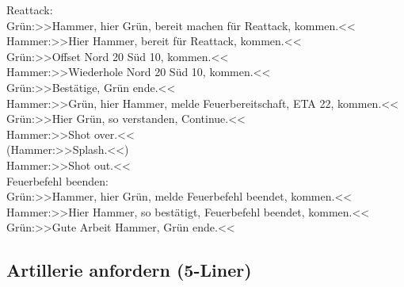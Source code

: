 	Reattack:  \\
	 Grün:>>Hammer, hier Grün, bereit machen für Reattack, kommen.<<  \\
	 Hammer:>>Hier Hammer, bereit für Reattack, kommen.<< \\
	 Grün:>>Offset Nord 20 Süd 10, kommen.<< \\
	 Hammer:>>Wiederhole Nord 20 Süd 10, kommen.<< \\
	 Grün:>>Bestätige, Grün ende.<< \\
	 Hammer:>>Grün, hier Hammer, melde Feuerbereitschaft, ETA 22, kommen.<< \\
	 Grün:>>Hier Grün, so verstanden, Continue.<< \\
	 Hammer:>>Shot over.<< \\
	 (Hammer:>>Splash.<<) \\
	 Hammer:>>Shot out.<< \\

	Feuerbefehl beenden: \\

	 Grün:>>Hammer, hier Grün, melde Feuerbefehl beendet, kommen.<< \\
	 Hammer:>>Hier Hammer, so bestätigt, Feuerbefehl beendet, kommen.<< \\
	 Grün:>>Gute Arbeit Hammer, Grün ende.<< \\



\subsection{Artillerie anfordern (5-Liner)}